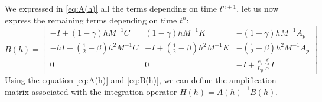 We expressed in \ref{eq:A(h)} all the terms depending on time $t^{n+1}$, let us now express the remaining terms depending on time $t^n$:
\begin{equation}
    B(h) = \begin{bmatrix} -I+(1-\gamma) h M^{-1} C & (1-\gamma) h M^{-1} K & -(1-\gamma) h M^{-1} A_p \\
    -h I + (\frac{1}{2}-\beta) h^2 M^{-1} C & -I+(\frac{1}{2}-\beta) h^2 M^{-1} K & -(\frac{1}{2}-\beta) h^2 M^{-1} A_p\\
    0 & 0 & -I+\frac{c_s}{L_p}\frac{f^p_x}{\alpha} I
    \end{bmatrix}
    \label{eq:B(h)}
\end{equation}
Using the equation \ref{eq:A(h)} and \ref{eq:B(h)}, we can define the amplification matrix associated with the integration operator $H(h) = A(h)^{-1} B(h)$.\\

